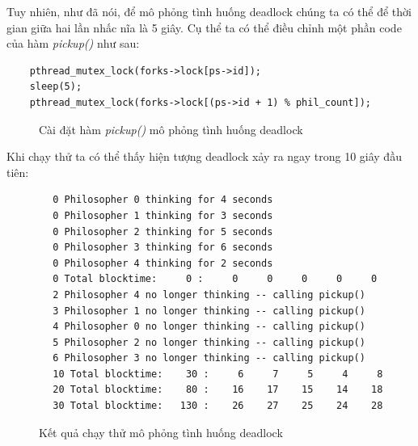 \documentclass{article}
\begin{document}
Tuy nhiên, như đã nói, để mô phỏng tình huống deadlock chúng ta có thể để thời gian giữa hai lần nhấc nĩa là 5 giây.
Cụ thể ta có thể điều chỉnh một phần code của hàm \textit{pickup()} như sau:
\begin{shaded}
    \begin{lstlisting}
    pthread_mutex_lock(forks->lock[ps->id]); 
    sleep(5);
    pthread_mutex_lock(forks->lock[(ps->id + 1) % phil_count]); 
    \end{lstlisting}
\end{shaded}
\begin{figure}[h]
    \centering
    \caption{Cài đặt hàm \textit{pickup()} mô phỏng tình huống deadlock}
\end{figure}
Khi chạy thử ta có thể thấy hiện tượng deadlock xảy ra ngay trong 10 giây đầu tiên:
\begin{verbatim}
        0 Philosopher 0 thinking for 4 seconds
        0 Philosopher 1 thinking for 3 seconds
        0 Philosopher 2 thinking for 5 seconds
        0 Philosopher 3 thinking for 6 seconds
        0 Philosopher 4 thinking for 2 seconds
        0 Total blocktime:     0 :     0     0     0     0     0 
        2 Philosopher 4 no longer thinking -- calling pickup()
        3 Philosopher 1 no longer thinking -- calling pickup()
        4 Philosopher 0 no longer thinking -- calling pickup()
        5 Philosopher 2 no longer thinking -- calling pickup()
        6 Philosopher 3 no longer thinking -- calling pickup()
        10 Total blocktime:    30 :     6     7     5     4     8 
        20 Total blocktime:    80 :    16    17    15    14    18 
        30 Total blocktime:   130 :    26    27    25    24    28 
\end{verbatim}

\begin{figure}[h]
    \centering
    \caption{Kết quả chạy thử mô phỏng tình huống deadlock}
\end{figure}
\end{document}
